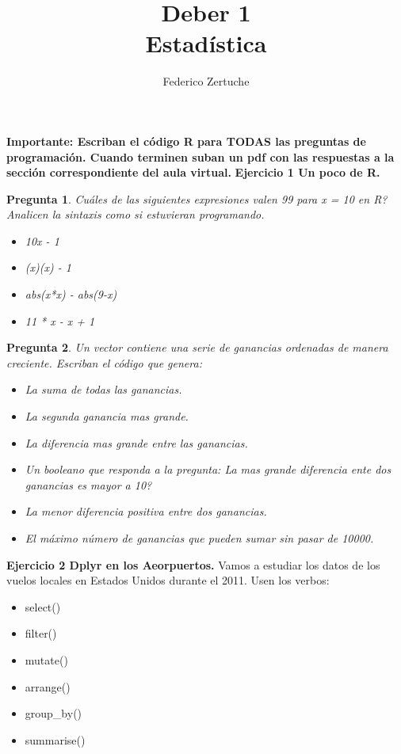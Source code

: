 \documentclass[12pt]{article}
\newtheorem{pregunta}{Pregunta}
\begin{document}
\title{Deber 1\\ Estadística}
\author{Federico Zertuche}
\date{}
\maketitle
\textbf{Importante: Escriban el código R para TODAS las preguntas de programación. Cuando terminen suban un pdf con las respuestas a la sección correspondiente del aula virtual.}
\vspace{1em}
\hline
\vspace{1em}
\large \textbf{Ejercicio 1 \quad Un poco de R.}
\vspace{1em}
\hline
\begin{pregunta}
Cuáles de las siguientes expresiones valen 99 para x = 10 en R? Analicen la sintaxis como si estuvieran programando.
\begin{itemize}
\item 10x - 1
\item (x)(x) - 1
\item abs(x*x) - abs(9-x)
\item 11 * x - x + 1
\end{itemize}
\end{pregunta}
\begin{pregunta}
Un vector contiene una serie de ganancias ordenadas de manera creciente. Escriban el código que genera:
\begin{itemize}
\item La suma de todas las ganancias.
\item La segunda ganancia mas grande.
\item La diferencia mas grande entre las ganancias.
\item Un booleano que responda a la pregunta: La mas grande diferencia ente dos ganancias es mayor a 10?
\item La menor diferencia positiva entre dos ganancias.
\item El máximo número de ganancias que pueden sumar sin pasar de 10000.
\end{itemize}
\end{pregunta}
\hline
\vspace{1em}
\textbf{Ejercicio 2 \quad Dplyr en los Aeorpuertos.}
\vspace{1em}
\hline
\vspace{1em}
Vamos a estudiar los datos de los vuelos locales en Estados Unidos durante el 2011. Usen los verbos:
\begin{itemize}
  \item select()
  \item filter()
  \item mutate()
  \item arrange()
  \item group\_by()
  \item summarise()
\end{itemize}
\end{document}
